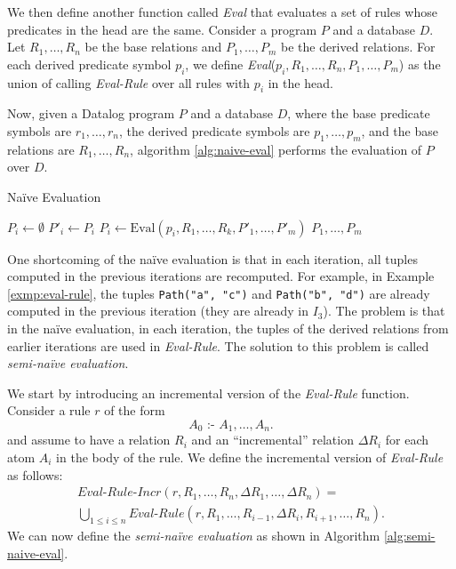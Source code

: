 \documentclass[11pt]{report}
\theoremstyle{definition}
\begin{document}
We then define another function called \textit{Eval} that evaluates a set of rules whose predicates in the head are the same. Consider a program $P$ and a database $D$. Let $R_1, \ldots, R_n$ be the base relations and $P_1, \ldots, P_m$ be the derived relations. For each derived predicate symbol $p_i$, we define \textit{Eval}($p_i, R_1, \ldots, R_n, P_1, \ldots, P_m$) as the union of calling \textit{Eval-Rule} over all rules with $p_i$ in the head.

Now, given a Datalog program $P$ and a database $D$, where the base predicate symbols are $r_1, \ldots, r_n$, the derived predicate symbols are $p_1, \ldots, p_m$, and the base relations are $R_1, \ldots, R_n$, algorithm \ref{alg:naive-eval} performs the evaluation of $P$ over $D$.

\begin{algorithm}
  \caption{Naïve Evaluation}
  \label{alg:naive-eval}
  \begin{algorithmic}[1] %
    \State $P_i \leftarrow  \emptyset$
    \EndFor
    \Repeat
    \State $P'_i \leftarrow  P_i$
    \EndFor
    \State $P_i \leftarrow  \text{Eval}(p_i, R_1, \ldots, R_k, P'_1, \ldots, P'_m)$
    \EndFor
    \State \Return $P_1, \ldots, P_m$
  \end{algorithmic}
\end{algorithm}

One shortcoming of the na\"ive evaluation is that in each iteration, all tuples computed in the previous iterations are recomputed. For example, in Example \ref{exmp:eval-rule}, the tuples \texttt{Path("a", "c")} and \texttt{Path("b", "d")} are already computed in the previous iteration (they are already in $I_3$). The problem is that in the na\"ive evaluation, in each iteration, the tuples of the derived relations from earlier iterations are used in \textit{Eval-Rule}. The solution to this problem is called \textit{semi-na\"ive evaluation}.

We start by introducing an incremental version of the \textit{Eval-Rule} function. Consider a rule $r$ of the form
$$A_0 \text{ :- } A_1, \ldots, A_n.$$
and assume to have a relation $R_i$ and an “incremental” relation $\Delta R_i$ for each atom $A_i$ in the body of the rule. We define the incremental version of \textit{Eval-Rule} as follows:
\begin{equation*}
  \begin{split}
    \textit{Eval-Rule-Incr}(r, R_1, \ldots, R_n,  \Delta R_1, \ldots, \Delta R_n) = \\
    \bigcup_{1 \leq i \leq n} \textit{Eval-Rule}(r, R_1, \ldots, R_{i-1}, \Delta R_i, R_{i+1}, \ldots, R_n).
  \end{split}
\end{equation*}
We can now define the \textit{semi-naïve evaluation} as shown in Algorithm \ref{alg:semi-naive-eval}.
\end{document}
